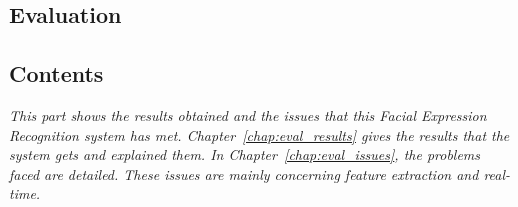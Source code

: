   \begin{titlepage}
    \vspace*{\fill}
      \part{Evaluation}
    \vspace*{\fill}
  \end{titlepage}

\startcontents[parts]
  
\chapter*{Contents}

\textit{This part shows the results obtained and the issues that this Facial Expression Recognition system has met. Chapter~\ref{chap:eval_results} gives the results that the system gets and explained them. In Chapter~\ref{chap:eval_issues}, the problems faced are detailed. These issues are mainly concerning \textit{feature extraction} and \textit{real-time}.}

\vspace{\baselineskip}


\pagebreak


\newpage

\newpage


\stopcontents[parts]